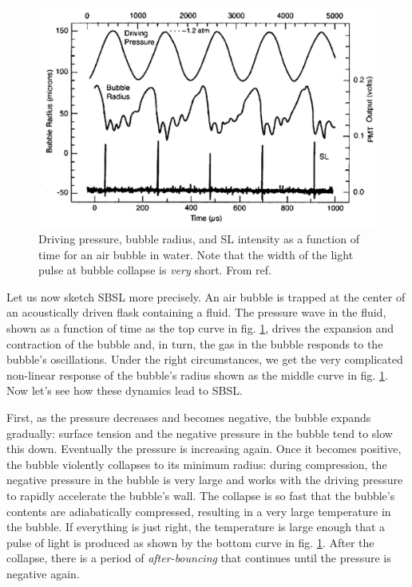 \documentclass[prb,aps,nofootinbib,superscriptaddress,floatfix]{revtex4-2}
\begin{document}
\begin{figure}
\includegraphics[width=0.7\linewidth]{figs/pulses}
    \caption{Driving pressure, bubble radius, and SL intensity as a function of time for an air bubble in water. Note that the width of the light pulse at bubble collapse is \emph{very} short. From ref. \cite{crum1994sonoluminescence}}
\label{fig:pulses}
\end{figure}

Let us now sketch SBSL more precisely. An air bubble is trapped at the center of an acoustically driven flask containing a fluid. The pressure wave in the fluid, shown as a function of time as the top curve in fig. \ref{fig:pulses}, drives the expansion and contraction of the bubble and, in turn, the gas in the bubble responds to the bubble's oscillations. Under the right circumstances, we get the very complicated non-linear response of the bubble's radius shown as the middle curve in fig. \ref{fig:pulses}. Now let's see how these dynamics lead to SBSL.

First, as the pressure decreases and becomes negative, the bubble expands gradually: surface tension and the negative pressure in the bubble tend to slow this down. Eventually the pressure is increasing again. Once it becomes positive, the bubble violently collapses to its minimum radius: during compression, the negative pressure in the bubble is very large and works with the driving pressure to rapidly accelerate the bubble's wall. The collapse is so fast that the bubble's contents are adiabatically compressed, resulting in a very large temperature in the bubble. If everything is just right, the temperature is large enough that a pulse of light is produced as shown by the bottom curve in fig. \ref{fig:pulses}. After the collapse, there is a period of \emph{after-bouncing} that continues until the pressure is negative again. 
\end{document}
